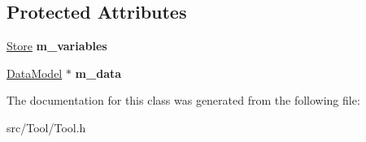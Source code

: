 \subsection*{Protected Attributes}
\begin{DoxyCompactItemize}
\item 
\hypertarget{classTool_a208aed50c1c50212d2927b372c38763f}{\hyperlink{classStore}{Store} {\bfseries m\-\_\-variables}}\label{classTool_a208aed50c1c50212d2927b372c38763f}

\item 
\hypertarget{classTool_a98d3ffa12f1de908da9030c8718ce3f5}{\hyperlink{classDataModel}{Data\-Model} $\ast$ {\bfseries m\-\_\-data}}\label{classTool_a98d3ffa12f1de908da9030c8718ce3f5}

\end{DoxyCompactItemize}


The documentation for this class was generated from the following file\-:\begin{DoxyCompactItemize}
\item 
src/\-Tool/Tool.\-h\end{DoxyCompactItemize}
